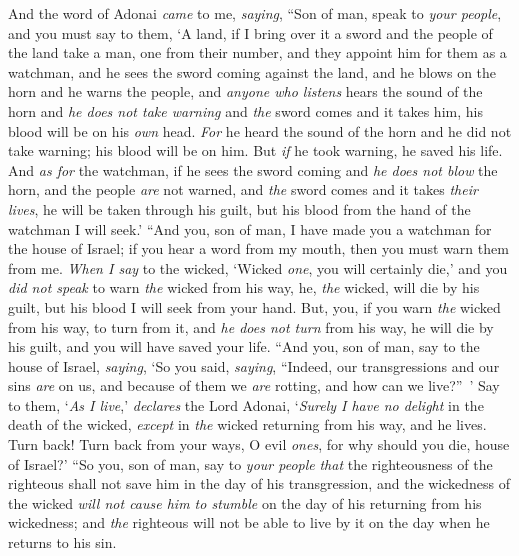 \begin{biblechapter} %
 And the word of Adonai \textit{came} to me, \textit{saying},
\verse “Son of man, speak to \textit{your people}, and you must say to them, ‘A land, if I bring over it a sword and the people of the land take a man, one from their number, and they appoint him for them as a watchman,
\verse and he sees the sword coming against the land, and he blows on the horn and he warns the people,
\verse and \textit{anyone who listens} hears the sound of the horn and \textit{he does not take warning} and \textit{the} sword comes and it takes him, his blood will be on his \textit{own} head.
\verse \textit{For} he heard the sound of the horn and he did not take warning; his blood will be on him. But \textit{if} he took warning, he saved his life.
\verse And \textit{as for} the watchman, if he sees the sword coming and \textit{he does not blow} the horn, and the people \textit{are} not warned, and \textit{the} sword comes and it takes \textit{their lives}, he will be taken through his guilt, but his blood from the hand of the watchman I will seek.’
\verse “And you, son of man, I have made you a watchman for the house of Israel; if you hear a word from my mouth, then you must warn them from me.
\verse \textit{When I say} to the wicked, ‘Wicked \textit{one}, you will certainly die,’ and you \textit{did not speak} to warn \textit{the} wicked from his way, he, \textit{the} wicked, will die by his guilt, but his blood I will seek from your hand.
\verse But, you, if you warn \textit{the} wicked from his way, to turn from it, and \textit{he does not turn} from his way, he will die by his guilt, and you will have saved your life.
\verse “And you, son of man, say to the house of Israel, \textit{saying}, ‘So you said, \textit{saying}, “Indeed, our transgressions and our sins \textit{are} on us, and because of them we \textit{are} rotting, and how can we live?” ’
\verse Say to them, ‘\textit{As I live},’ \textit{declares} the Lord Adonai, ‘\textit{Surely I have no delight} in the death of the wicked, \textit{except} in \textit{the} wicked returning from his way, and he lives. Turn back! Turn back from your ways, O evil \textit{ones}, for why should you die, house of Israel?’
\verse “So you, son of man, say to \textit{your people} \textit{that} the righteousness of the righteous shall not save him in the day of his transgression, and the wickedness of the wicked \textit{will not cause him to stumble} on the day of his returning from his wickedness; and \textit{the} righteous will not be able to live by it on the day when he returns to his sin.

\end{biblechapter}
